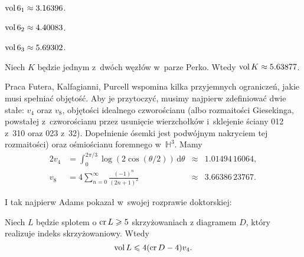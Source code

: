\begin{example}
    $\operatorname{vol} 6_1 \approx 3.16396$.
\end{example}

\begin{example}
    $\operatorname{vol} 6_2 \approx 4.40083$.
\end{example}

\begin{example}
    $\operatorname{vol} 6_3 \approx 5.69302$.
\end{example}

\begin{example}
%
    Niech $K$ będzie jednym z~dwóch węzłów w~parze Perko.
    Wtedy $\operatorname{vol} K \approx 5.63877$.
\end{example}

Praca Futera, Kalfagianni, Purcell \cite{purcell2019} wspomina kilka przyjemnych ograniczeń, jakie musi spełniać objętość.
%
%
%
Aby je przytoczyć, musimy najpierw zdefiniować dwie stałe: $v_4$ oraz $v_8$, objętości idealnego czworościanu (albo rozmaitości Giesekinga, powstałej z~czworościanu przez usunięcie  wierzchołków i~sklejenie ściany 012 z~310 oraz 023 z~32).
 Dopełnienie ósemki jest podwójnym nakryciem tej rozmaitości) oraz ośmiościanu foremnego w~$\mathbb H^3$.
%
Mamy
\begin{alignat}{2}
    v_4 & = \int_{0}^{2\pi/3} \log(2 \cos(\theta/2)) \,\mathrm{d}\theta & {}\approx{} & 1.01494\,16064, \\
    v_8 & = 4 \sum_{n=0}^\infty \frac{(-1)^n}{(2n+1)^2} &{}\approx{}& 3.66386\,23767.
\end{alignat}

I tak najpierw Adams \cite{adams1983} pokazał w~swojej rozprawie doktorskiej:
%

\begin{proposition}
    Niech $L$ będzie splotem o $\operatorname{cr} L \geqslant 5$ skrzyżowaniach z diagramem $D$, który realizuje indeks skrzyżowaniowy.
    Wtedy
    \begin{equation}
        \operatorname{vol} L \leqslant 4 (\operatorname{cr} D - 4) v_4.
    \end{equation}
\end{proposition}


